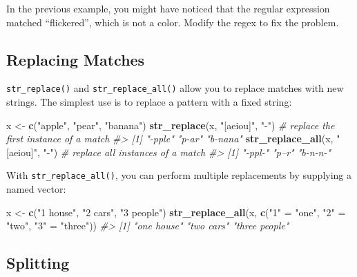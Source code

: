 \documentclass[
]{book}
\newenvironment{Shaded}{\begin{snugshade}}{\end{snugshade}}
\newcommand{\CommentTok}[1]{\textcolor[rgb]{0.56,0.35,0.01}{\textit{#1}}}
\newcommand{\KeywordTok}[1]{\textcolor[rgb]{0.13,0.29,0.53}{\textbf{#1}}}
\newcommand{\NormalTok}[1]{#1}
\newcommand{\StringTok}[1]{\textcolor[rgb]{0.31,0.60,0.02}{#1}}
\begin{document}
In the previous example, you might have noticed that the regular expression matched ``flickered'', which is not a color. Modify the regex to fix the problem.

\hypertarget{replacing-matches}{%
\subsection{Replacing Matches}\label{replacing-matches}}

\texttt{str\_replace()} and \texttt{str\_replace\_all()} allow you to replace matches with new strings. The simplest use is to replace a pattern with a fixed string:

\begin{Shaded}
\begin{Highlighting}[]
\NormalTok{x <-}\StringTok{ }\KeywordTok{c}\NormalTok{(}\StringTok{"apple"}\NormalTok{, }\StringTok{"pear"}\NormalTok{, }\StringTok{"banana"}\NormalTok{)}
\KeywordTok{str_replace}\NormalTok{(x, }\StringTok{"[aeiou]"}\NormalTok{, }\StringTok{"-"}\NormalTok{) }\CommentTok{# replace the first instance of a match}
\CommentTok{#> [1] "-pple"  "p-ar"   "b-nana"}
\KeywordTok{str_replace_all}\NormalTok{(x, }\StringTok{"[aeiou]"}\NormalTok{, }\StringTok{"-"}\NormalTok{) }\CommentTok{# replace all instances of a match}
\CommentTok{#> [1] "-ppl-"  "p--r"   "b-n-n-"}
\end{Highlighting}
\end{Shaded}

With \texttt{str\_replace\_all()}, you can perform multiple replacements by supplying a named vector:

\begin{Shaded}
\begin{Highlighting}[]
\NormalTok{x <-}\StringTok{ }\KeywordTok{c}\NormalTok{(}\StringTok{"1 house"}\NormalTok{, }\StringTok{"2 cars"}\NormalTok{, }\StringTok{"3 people"}\NormalTok{)}
\KeywordTok{str_replace_all}\NormalTok{(x, }\KeywordTok{c}\NormalTok{(}\StringTok{"1"}\NormalTok{ =}\StringTok{ "one"}\NormalTok{, }\StringTok{"2"}\NormalTok{ =}\StringTok{ "two"}\NormalTok{, }\StringTok{"3"}\NormalTok{ =}\StringTok{ "three"}\NormalTok{))}
\CommentTok{#> [1] "one house"    "two cars"     "three people"}
\end{Highlighting}
\end{Shaded}

\hypertarget{splitting}{%
\subsection{Splitting}\label{splitting}}
\end{document}
